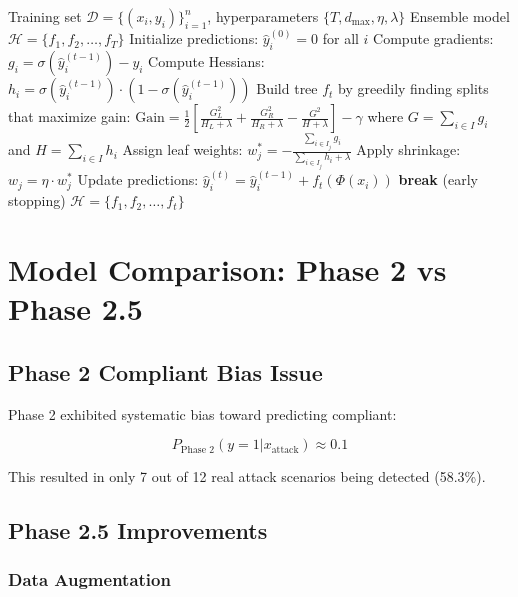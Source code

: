 \documentclass[12pt,a4paper]{article}
\begin{document}
\begin{algorithm}
\caption{XGBoost Training - Phase 2.5}
\begin{algorithmic}[1]
\REQUIRE Training set $\mathcal{D} = \{(x_i, y_i)\}_{i=1}^{n}$, hyperparameters $\{T, d_{\text{max}}, \eta, \lambda\}$
\ENSURE Ensemble model $\mathcal{H} = \{f_1, f_2, \ldots, f_T\}$
\STATE Initialize predictions: $\hat{y}_i^{(0)} = 0$ for all $i$
    \STATE Compute gradients: $g_i = \sigma(\hat{y}_i^{(t-1)}) - y_i$
    \STATE Compute Hessians: $h_i = \sigma(\hat{y}_i^{(t-1)}) \cdot (1 - \sigma(\hat{y}_i^{(t-1)}))$
    \STATE Build tree $f_t$ by greedily finding splits that maximize gain:
    \STATE \qquad $\text{Gain} = \frac{1}{2} \left[ \frac{G_L^2}{H_L + \lambda} + \frac{G_R^2}{H_R + \lambda} - \frac{G^2}{H + \lambda} \right] - \gamma$
    \STATE \qquad where $G = \sum_{i \in I} g_i$ and $H = \sum_{i \in I} h_i$
    \STATE Assign leaf weights: $w_j^* = -\frac{\sum_{i \in I_j} g_i}{\sum_{i \in I_j} h_i + \lambda}$
    \STATE Apply shrinkage: $w_j = \eta \cdot w_j^*$
    \STATE Update predictions: $\hat{y}_i^{(t)} = \hat{y}_i^{(t-1)} + f_t(\Phi(x_i))$
        \STATE \textbf{break} (early stopping)
    \ENDIF
\ENDFOR
\RETURN $\mathcal{H} = \{f_1, f_2, \ldots, f_t\}$
\end{algorithmic}
\end{algorithm}

\section{Model Comparison: Phase 2 vs Phase 2.5}

\subsection{Phase 2 Compliant Bias Issue}

Phase 2 exhibited systematic bias toward predicting compliant:

$$P_{\text{Phase 2}}(y = 1 | x_{\text{attack}}) \approx 0.1$$

This resulted in only 7 out of 12 real attack scenarios being detected (58.3\%).

\subsection{Phase 2.5 Improvements}

\subsubsection{Data Augmentation}
\end{document}
